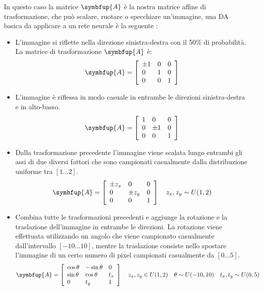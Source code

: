 In questo caso la matrice \(\symbfup{A}\) è la nostra matrice affine di trasformazione, che può scalare, ruotare o specchiare un'immagine, una DA basica da applicare a un rete neurale è la seguente \cite{nanni_dct_pca} \cite{gonzalez_dip}:
\begin{itemize}
    \item L'immagine si riflette nella direzione sinistra-destra con il 50\% di probabilità. La matrice di trasformazione \(\symbfup{A}\) è:
    \[\symbfup{A} = \left[\begin{array}{lll}\pm 1 & 0 & 0 \\ 0 & 1 & 0 \\ 0 & 0 & 1\end{array}\right]\]
    \item L'immagine è riflessa in modo casuale in entrambe le direzioni sinistra-destra e in alto-basso.
    \[\symbfup{A} = \left[\begin{array}{lll}1 & 0 & 0 \\ 0 & \pm 1 & 0 \\ 0 & 0 & 1\end{array}\right]\]
    \item Dalla trasformazione precedente l'immagine viene scalata lungo entrambi gli assi di due diversi fattori che sono
    campionati casualmente dalla distribuzione uniforme tra \([1...2]\).
    \[\symbfup{A} = \left[\begin{array}{lll}\pm z_x & 0 & 0 \\ 0 & \pm z_y & 0 \\ 0 & 0 & 1\end{array}\right] \quad z_x, z_y \sim U(1,2)\]
    \item Combina tutte le trasformazioni precedenti  e aggiunge la rotazione e la traslazione dell'immagine in entrambe le
    direzioni. La rotazione viene effettuata utilizzando un angolo che viene campionato casualmente dall'intervallo
    \([-10...10]\), mentre la traslazione consiste nello spostare l'immagine di un certo numero di pixel
    campionati casualmente da \([0...5]\).
    \[\symbfup{A} = \left[ \begin{array} { lll } \cos \theta & - \sin \theta & 0 \\ \sin \theta & \cos \theta & t_x \\ 0 & t_y & 1 \end{array} \right] \quad z_x, z_y \in U(1,2) \quad \theta \sim U(-10,10) \quad t_x, t_y \sim U(0,5)\]
\end{itemize}

